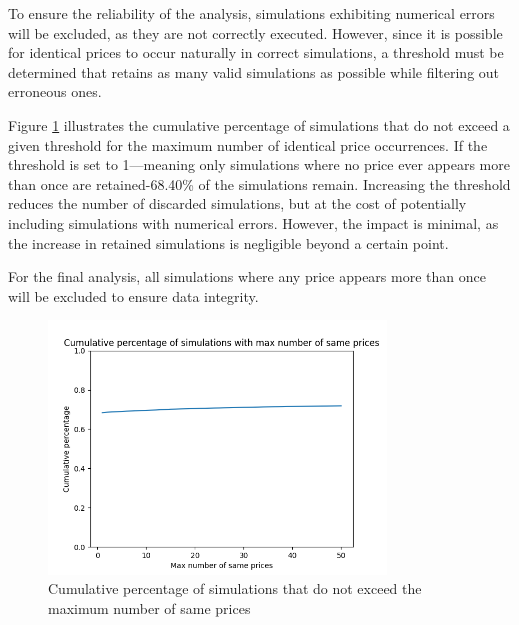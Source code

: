 To ensure the reliability of the analysis, simulations exhibiting numerical errors will be excluded, as they are not correctly executed. However, since it is possible for identical prices to occur naturally in correct simulations, a threshold must be determined that retains as many valid simulations as possible while filtering out erroneous ones.

Figure \ref{fig:max_number_of_same_prices_cumulative_percentage} illustrates the cumulative percentage of simulations that do not exceed a given threshold for the maximum number of identical price occurrences. If the threshold is set to 1—meaning only simulations where no price ever appears more than once are retained-68.40\% of the simulations remain. Increasing the threshold reduces the number of discarded simulations, but at the cost of potentially including simulations with numerical errors. However, the impact is minimal, as the increase in retained simulations is negligible beyond a certain point.

For the final analysis, all simulations where any price appears more than once will be excluded to ensure data integrity.

\begin{figure}
    \centering
    \includegraphics[width=0.8\textwidth]{img/max_number_of_same_prices_cumulative_percentage.png}
    \caption{Cumulative percentage of simulations that do not exceed the maximum number of same prices}
    \label{fig:max_number_of_same_prices_cumulative_percentage}
\end{figure}

